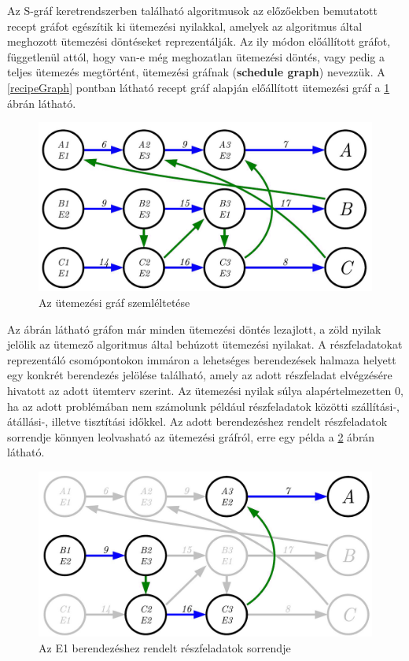 Az S-gráf keretrendszerben található algoritmusok az előzőekben bemutatott recept gráfot egészítik ki ütemezési nyilakkal, amelyek az algoritmus által meghozott ütemezési döntéseket reprezentálják.
Az ily módon előállított gráfot, függetlenül attól, hogy van-e még meghozatlan ütemezési döntés, vagy pedig a teljes ütemezés megtörtént, ütemezési gráfnak (\textbf{schedule graph}) nevezzük.
A \ref{recipeGraph} pontban látható recept gráf alapján előállított ütemezési gráf a \ref{scheduleGraph} ábrán látható.
\begin{figure}[H]
\begin{center}
\includegraphics[scale=0.375]{scheduleGraph}
\caption{Az ütemezési gráf szemléltetése}
\label{scheduleGraph}
\end{center}
\end{figure}
Az ábrán látható gráfon már minden ütemezési döntés lezajlott, a zöld nyilak jelölik az ütemező algoritmus által behúzott ütemezési nyilakat.
A részfeladatokat reprezentáló csomópontokon immáron a lehetséges berendezések halmaza helyett egy konkrét berendezés jelölése található, amely az adott részfeladat elvégzésére hivatott az adott ütemterv szerint.
Az ütemezési nyilak súlya alapértelmezetten $0$, ha az adott problémában nem számolunk például részfeladatok közötti szállítási-, átállási-, illetve tisztítási időkkel.
Az adott berendezéshez rendelt részfeladatok sorrendje könnyen leolvasható az ütemezési gráfról, erre egy példa a \ref{unitSequence} ábrán látható.
\begin{figure}[H]
\begin{center}
\includegraphics[scale=0.375]{unitSequence}
\caption{Az E1 berendezéshez rendelt részfeladatok sorrendje}
\label{unitSequence}
\end{center}
\end{figure}
